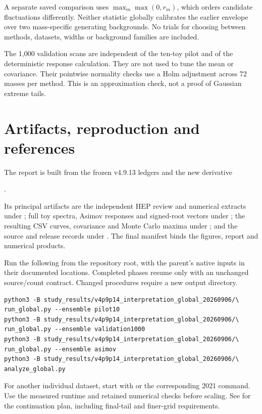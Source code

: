 \documentclass[11pt]{article}
\begin{document}
A separate saved comparison uses $\max_m\max(0,r_m)$, which orders candidate fluctuations differently. Neither statistic globally calibrates the earlier envelope over two mass-specific generating backgrounds. No trials for choosing between methods, datasets, widths or background families are included.

The 1,000 validation scans are independent of the ten-toy pilot and of the deterministic response calculation. They are not used to tune the mean or covariance. Their pointwise normality checks use a Holm adjustment across 72 masses per method. This is an approximation check, not a proof of Gaussian extreme tails.

\clearpage
\section{Artifacts, reproduction and references}
The report is built from the frozen v4.9.13 ledgers and the new derivative
\begin{center}\small{}.\end{center}
Its principal artifacts are the independent HEP review and numerical extracts under ; full toy spectra, Asimov responses and signed-root vectors under ; the resulting CSV curves, covariance and Monte Carlo maxima under ; and the source and release records under . The final manifest binds the figures, report and numerical products.

Run the following from the repository root, with the parent's native inputs in their documented locations. Completed phases resume only with an unchanged source/count contract. Changed procedures require a new output directory.
\begin{verbatim}
python3 -B study_results/v4p9p14_interpretation_global_20260906/\
run_global.py --ensemble pilot10
python3 -B study_results/v4p9p14_interpretation_global_20260906/\
run_global.py --ensemble validation1000
python3 -B study_results/v4p9p14_interpretation_global_20260906/\
run_global.py --ensemble asimov
python3 -B study_results/v4p9p14_interpretation_global_20260906/\
analyze_global.py
\end{verbatim}
For another individual dataset, start with  or the corresponding 2021 command. Use the measured runtime and retained numerical checks before scaling. See  for the continuation plan, including final-tail and finer-grid requirements.
\end{document}
